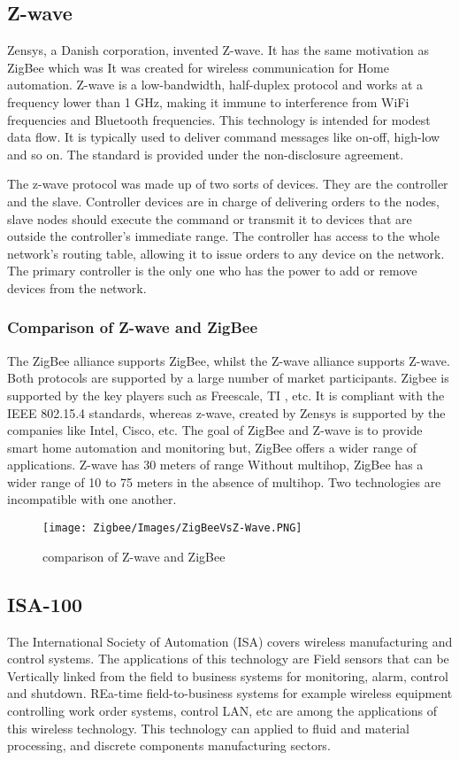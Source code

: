 \documentclass[conference]{IEEEtran}
\begin{document}
\subsection{Z-wave}
Zensys, a Danish corporation, invented Z-wave. It has the same motivation as ZigBee which was It was created for wireless communication for Home automation. Z-wave is a low-bandwidth, half-duplex protocol and works at a frequency lower than 1 GHz, making it immune to interference from WiFi frequencies and Bluetooth frequencies. This technology is intended for modest data flow. It is typically used to deliver command messages like on-off, high-low and so on. The standard is provided under the non-disclosure agreement. 

The z-wave protocol was made up of two sorts of devices. They are the controller and the slave. Controller devices are in charge of delivering orders to the nodes, slave nodes should execute the command or transmit it to devices that are outside the controller’s immediate range. The controller has access to the whole network’s routing table, allowing it to issue orders to any device on the network. The primary controller is the only one who has the power to add or remove devices from the network.  

\subsubsection{Comparison of Z-wave and ZigBee}
The ZigBee alliance supports ZigBee, whilst the Z-wave alliance supports Z-wave. Both protocols are supported by a large number of market participants. Zigbee is supported by the key players such as Freescale, TI , etc. It is compliant with the IEEE 802.15.4 standards, whereas z-wave, created by Zensys is supported by the companies like Intel, Cisco, etc. The goal of ZigBee and Z-wave is to provide smart home automation and monitoring but, ZigBee offers a wider range of applications. Z-wave has 30 meters of range Without multihop, ZigBee has a wider range of 10 to 75 meters in the absence of multihop. Two technologies are incompatible with one another. \cite{WangJiangZhang2023}

\begin{figure}[htbp]
    \centering
    \texttt{[image: Zigbee/Images/ZigBeeVsZ-Wave.PNG]}
    \caption{comparison of Z-wave and ZigBee \cite{WangJiangZhang2023}}
    \label{fig: comparison of Z-wave and ZigBee}
\end{figure}

\subsection{ISA-100}
The International Society of Automation (ISA) covers wireless manufacturing and control systems. The applications of this technology are Field sensors that can be Vertically linked from the field to business systems for monitoring, alarm, control and shutdown. REa-time field-to-business systems for example wireless equipment controlling work order systems, control LAN, etc are among the applications of this wireless technology. This technology can applied to fluid and material processing, and discrete components manufacturing sectors. \cite{ISA2023}
\end{document}
